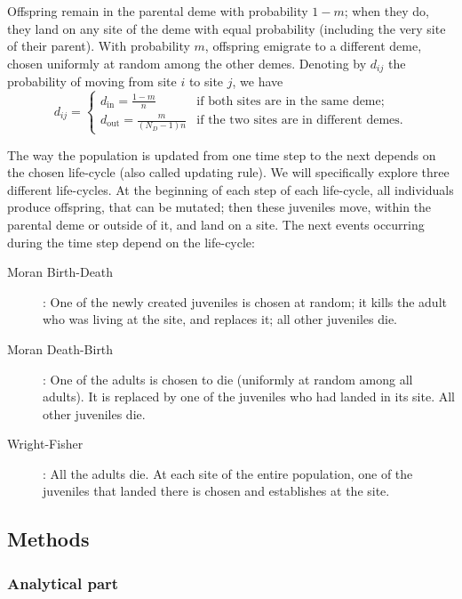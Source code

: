 \documentclass[11pt, letterpaper]{article}
\newcommand{\din}{d_{\textrm{in}}}
\newcommand{\dout}{d_{\textrm{out}}}
\newcommand{\ndemes}{N_D}
\begin{document}
Offspring remain in the parental deme with probability $1-m$; when they do, they land on any site of the deme with equal probability (including the very site of their parent). With probability $m$, offspring emigrate to a different deme, chosen uniformly at random among the other demes. Denoting by $d_{ij}$ the probability of moving from site $i$ to site $j$, we have
\begin{equation}\label{eq:defD}
d_{ij} = \begin{cases}
 \din =  \frac{1-m}{n} & \textrm{if both sites are in the same deme;}\\
 \dout = \frac{m}{(\ndemes-1) n} & \textrm{if the two sites are in different demes.} 
\end{cases}
\end{equation}

The way the population is updated from one time step to the next depends on the chosen life-cycle (also called updating rule). We will specifically explore three different life-cycles. At the beginning of each step of each life-cycle, all individuals produce offspring, that can be mutated; then these juveniles move, within the parental deme or outside of it, and land on a site. The next events occurring during the time step depend on the life-cycle:
\begin{description}
\item[Moran Birth-Death]: One of the newly created juveniles is chosen at random; it kills the adult who was living at the site, and replaces it; all other juveniles die. 
\item[Moran Death-Birth]: One of the adults is chosen to die (uniformly at random among all adults). It is replaced by one of the juveniles who had landed in its site. All other juveniles die. 
\item[Wright-Fisher]: All the adults die. At each site of the entire population, one of the juveniles that landed there is chosen and establishes at the site. 
\end{description}
  
\subsection{Methods}
\subsubsection{Analytical part}
\end{document}
